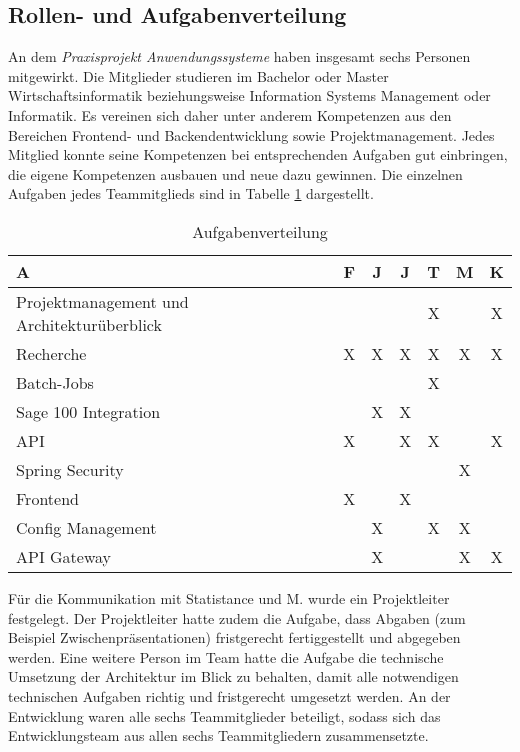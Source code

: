 \subsection{Rollen- und Aufgabenverteilung}
An dem \textit{Praxisprojekt Anwendungssysteme} haben insgesamt sechs Personen mitgewirkt. Die Mitglieder studieren im Bachelor oder Master Wirtschaftsinformatik beziehungsweise Information Systems Management oder Informatik. Es vereinen sich daher unter anderem Kompetenzen aus den Bereichen Frontend- und Backendentwicklung sowie Projektmanagement. Jedes Mitglied konnte seine Kompetenzen bei entsprechenden Aufgaben gut einbringen, die eigene Kompetenzen ausbauen und neue dazu gewinnen.
Die einzelnen Aufgaben jedes Teammitglieds sind in Tabelle \ref{tab:tasks} dargestellt.
\begin{table}[h!]
\begin{tabular}{|p{7cm}|c|c|c|c|c|c|}
\hline
\textbf{A} & \textbf{F}  & \textbf{J} & \textbf{J}& \textbf{T} & \textbf{M} & \textbf{K} \\ \hline \bottomrule
Projektmanagement und \newline Architekturüberblick &  &  &  & X &  & X \\ \hline
Recherche & X & X & X & X & X & X \\ \hline
Batch-Jobs &  &  &  & X &  &  \\ \hline
Sage 100 Integration &  & X & X &  &  &  \\ \hline
API & X &  & X & X &  & X \\ \hline
Spring Security &  &  &  & & X &  \\ \hline
Frontend  & X &  & X &  &  &  \\ \hline
Config Management  &  & X &  & X & X &  \\ \hline
API Gateway &  & X &  &  & X & X \\ \hline
\end{tabular}
\caption{Aufgabenverteilung}
\label{tab:tasks}
\end{table}

Für die Kommunikation mit Statistance und M. wurde ein Projektleiter festgelegt. Der Projektleiter hatte zudem die Aufgabe, dass Abgaben (zum Beispiel Zwischenpräsentationen) fristgerecht fertiggestellt und abgegeben werden. Eine weitere Person im Team hatte die Aufgabe die technische Umsetzung der Architektur im Blick zu behalten, damit alle notwendigen technischen Aufgaben richtig und fristgerecht umgesetzt werden. An der Entwicklung waren alle sechs Teammitglieder beteiligt, sodass sich das Entwicklungsteam aus allen sechs Teammitgliedern zusammensetzte.